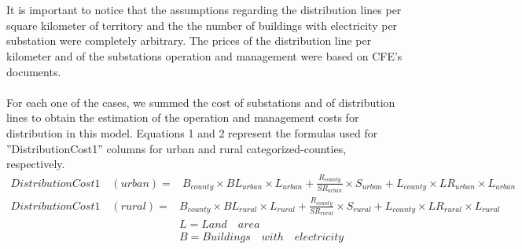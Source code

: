 \documentclass[•]{article}
\begin{document}
\\
\\It is important to notice that the assumptions regarding the distribution lines per square kilometer of territory and the the number of buildings with electricity per substation were completely arbitrary. The prices of the distribution line per kilometer and of the substations operation and management were based on CFE's documents\cite{cfe2}.
\\
\\For each one of the cases, we summed the cost of substations and of distribution lines to obtain the estimation of the operation and management costs for distribution in this model. Equations 1 and 2 represent the formulas used for ''DistributionCost1'' columns for urban and rural categorized-counties, respectively.
\begin{equation}
\begin{aligned}
DistributionCost1\quad (urban) = & B_{county} \times BL_{urban} \times L_{urban} + \frac{R_{county}}{SR_{urban}} \times S_{urban} + L_{county } \times LR_{urban} \times L_{urban}
\end{aligned}
\end{equation}
\begin{equation}
\begin{aligned}
DistributionCost1\quad (rural) = & B_{county} \times BL_{rural} \times L_{rural} + \frac{R_{county}}{SR_{rural}} \times S_{rural} + L_{county} \times LR_{rural} \times L_{rural}
\\& L = Land\quad area
\\& B = Buildings\quad with\quad electricity
\end{aligned}
\end{equation}
\end{document}
